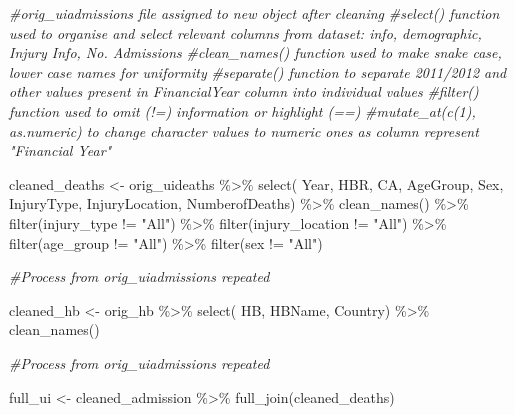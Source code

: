 \documentclass[
]{article}
\newenvironment{Shaded}{\begin{snugshade}}{\end{snugshade}}
\newcommand{\CommentTok}[1]{\textcolor[rgb]{0.56,0.35,0.01}{\textit{#1}}}
\newcommand{\FunctionTok}[1]{\textcolor[rgb]{0.00,0.00,0.00}{#1}}
\newcommand{\NormalTok}[1]{#1}
\newcommand{\OtherTok}[1]{\textcolor[rgb]{0.56,0.35,0.01}{#1}}
\newcommand{\SpecialCharTok}[1]{\textcolor[rgb]{0.00,0.00,0.00}{#1}}
\newcommand{\StringTok}[1]{\textcolor[rgb]{0.31,0.60,0.02}{#1}}
\begin{document}
\begin{Shaded}
\begin{Highlighting}[]
\CommentTok{\#orig\_uiadmissions file assigned to new object after cleaning}
\CommentTok{\#select() function used to organise and select relevant columns from dataset: info, demographic, Injury Info, No. Admissions}
\CommentTok{\#clean\_names() function used to make snake case, lower case names for uniformity}
\CommentTok{\#separate() function to separate 2011/2012 and other values present in FinancialYear column into individual values}
\CommentTok{\#filter() function used to omit (!=) information or highlight (==)}
\CommentTok{\#mutate\_at(c(1), as.numeric) to change character values to numeric ones as column represent "Financial Year"}
     

\NormalTok{cleaned\_deaths }\OtherTok{\textless{}{-}}\NormalTok{ orig\_uideaths }\SpecialCharTok{\%\textgreater{}\%} 
  \FunctionTok{select}\NormalTok{( Year,}
\NormalTok{       HBR,}
\NormalTok{       CA,}
\NormalTok{       AgeGroup,}
\NormalTok{       Sex,}
\NormalTok{       InjuryType,}
\NormalTok{       InjuryLocation,}
\NormalTok{       NumberofDeaths) }\SpecialCharTok{\%\textgreater{}\%} 
  \FunctionTok{clean\_names}\NormalTok{() }\SpecialCharTok{\%\textgreater{}\%} 
  \FunctionTok{filter}\NormalTok{(injury\_type }\SpecialCharTok{!=} \StringTok{"All"}\NormalTok{) }\SpecialCharTok{\%\textgreater{}\%} 
  \FunctionTok{filter}\NormalTok{(injury\_location }\SpecialCharTok{!=} \StringTok{"All"}\NormalTok{) }\SpecialCharTok{\%\textgreater{}\%} 
  \FunctionTok{filter}\NormalTok{(age\_group }\SpecialCharTok{!=} \StringTok{"All"}\NormalTok{) }\SpecialCharTok{\%\textgreater{}\%} 
  \FunctionTok{filter}\NormalTok{(sex }\SpecialCharTok{!=} \StringTok{"All"}\NormalTok{)}

\CommentTok{\#Process from orig\_uiadmissions repeated}

\NormalTok{cleaned\_hb }\OtherTok{\textless{}{-}}\NormalTok{ orig\_hb }\SpecialCharTok{\%\textgreater{}\%} 
  \FunctionTok{select}\NormalTok{( HB,}
\NormalTok{       HBName,}
\NormalTok{       Country) }\SpecialCharTok{\%\textgreater{}\%} 
  \FunctionTok{clean\_names}\NormalTok{()}
  
\CommentTok{\#Process from orig\_uiadmissions repeated}
\end{Highlighting}
\end{Shaded}

\begin{Shaded}
\begin{Highlighting}[]
\NormalTok{full\_ui }\OtherTok{\textless{}{-}}\NormalTok{ cleaned\_admission }\SpecialCharTok{\%\textgreater{}\%}
  \FunctionTok{full\_join}\NormalTok{(cleaned\_deaths)}
\end{Highlighting}
\end{Shaded}
\end{document}
